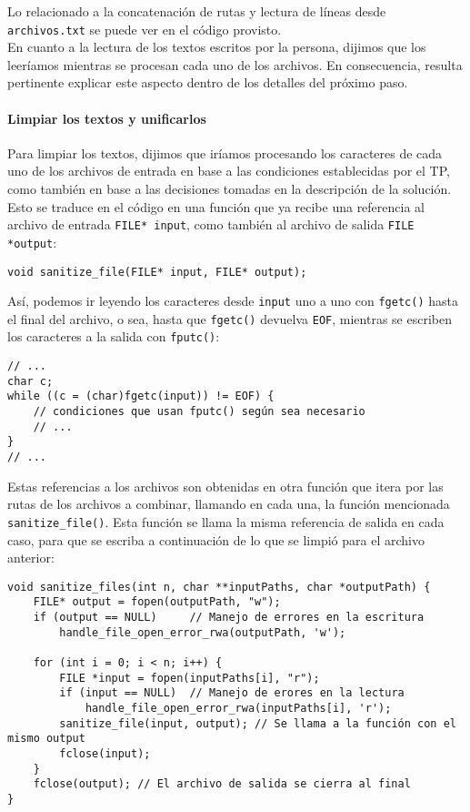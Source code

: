 \documentclass[a4paper]{article}
\begin{document}
Lo relacionado a la concatenación de rutas y lectura de líneas desde \texttt{archivos.txt} se puede ver en el código provisto. \\

En cuanto a la lectura de los textos escritos por la persona, dijimos que los leeríamos mientras se procesan cada uno de los archivos. En consecuencia, resulta pertinente explicar este aspecto dentro de los detalles del próximo paso.

\paragraph{Limpiar los textos y unificarlos}

Para limpiar los textos, dijimos que iríamos procesando los caracteres de cada uno de los archivos de entrada en base a las condiciones establecidas por el TP, como también en base a las decisiones tomadas en la descripción de la solución. Esto se traduce en el código en una función que ya recibe una referencia al archivo de entrada \texttt{FILE* input}, como también al archivo de salida \texttt{FILE *output}:

\begin{verbatim}
void sanitize_file(FILE* input, FILE* output);
\end{verbatim}

Así, podemos ir leyendo los caracteres desde \texttt{input} uno a uno con \texttt{fgetc()} hasta el final del archivo, o sea, hasta que \texttt{fgetc()} devuelva \texttt{EOF}, mientras se escriben los caracteres a la salida con \texttt{fputc()}:

\begin{verbatim}
// ...
char c;
while ((c = (char)fgetc(input)) != EOF) {
    // condiciones que usan fputc() según sea necesario
    // ...
}
// ...
\end{verbatim}

Estas referencias a los archivos son obtenidas en otra función que itera por las rutas de los archivos a combinar, llamando en cada una, la función mencionada \texttt{sanitize\_file()}. Esta función se llama la misma referencia de salida en cada caso, para que se escriba a continuación de lo que se limpió para el archivo anterior:

\begin{verbatim}
void sanitize_files(int n, char **inputPaths, char *outputPath) {
    FILE* output = fopen(outputPath, "w");
    if (output == NULL)     // Manejo de errores en la escritura
        handle_file_open_error_rwa(outputPath, 'w');

    for (int i = 0; i < n; i++) {
        FILE *input = fopen(inputPaths[i], "r");
        if (input == NULL)  // Manejo de erores en la lectura
            handle_file_open_error_rwa(inputPaths[i], 'r');
        sanitize_file(input, output); // Se llama a la función con el mismo output
        fclose(input);
    }
    fclose(output); // El archivo de salida se cierra al final
}
\end{verbatim}
\end{document}
